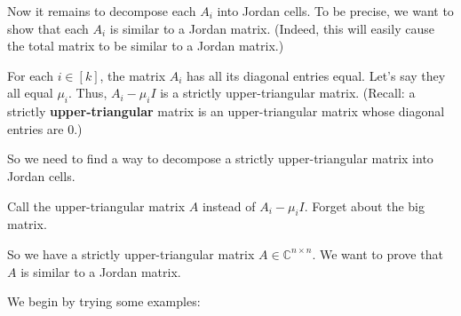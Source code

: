 \documentclass[numbers=enddot,12pt,final,onecolumn,notitlepage]{scrartcl}%
\numberwithin{exer}{subsection}
\theoremstyle{definition}
\begin{document}
Now it remains to decompose each $A_{i}$ into Jordan cells. To be precise, we
want to show that each $A_{i}$ is similar to a Jordan matrix. (Indeed, this
will easily cause the total matrix to be similar to a Jordan matrix.)

For each $i\in\left[  k\right]  $, the matrix $A_{i}$ has all its diagonal
entries equal. Let's say they all equal $\mu_{i}$. Thus, $A_{i}-\mu_{i}I$ is a
strictly upper-triangular matrix. (Recall: a strictly
\textbf{upper-triangular} matrix is an upper-triangular matrix whose diagonal
entries are $0$.)

So we need to find a way to decompose a strictly upper-triangular matrix into
Jordan cells.

Call the upper-triangular matrix $A$ instead of $A_{i}-\mu_{i}I$. Forget about
the big matrix.

\bigskip

So we have a strictly upper-triangular matrix $A\in\mathbb{C}^{n\times n}$. We
want to prove that $A$ is similar to a Jordan matrix.

We begin by trying some examples:\newline
\end{document}
